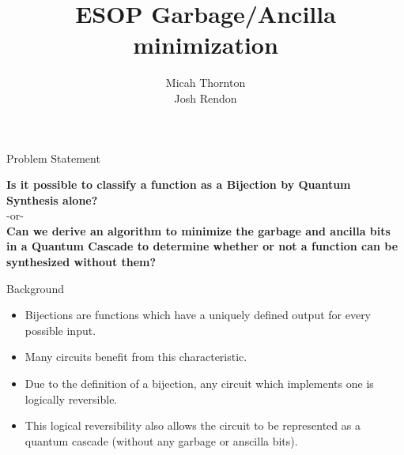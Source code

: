 \documentclass[pdf]{beamer}
\title{ESOP Garbage/Ancilla minimization}
\subtitle{}
\author{Micah Thornton \\ Josh Rendon}
\begin{document}
\begin{frame}
\titlepage
\end{frame}

\begin{frame}{Problem Statement}
    \begin{center}
    \textbf{Is it possible to classify a function as a Bijection by Quantum Synthesis alone?} \\ 
    -or-\\ 
    \textbf{Can we derive an algorithm to minimize the garbage and ancilla bits in a Quantum Cascade to determine whether or not a function can be synthesized without them?}
    \end{center}
\end{frame}

\begin{frame}{Background}
\begin{itemize}
   \item Bijections are functions which have a uniquely defined output for every possible input.
   \item Many circuits benefit from this characteristic. 
   \item Due to the definition of a bijection, any circuit which implements one is logically reversible. 
   \item This logical reversibility also allows the circuit to be represented as a quantum cascade (without any garbage or anscilla bits).
\end{itemize}
\end{frame}
\end{document}
